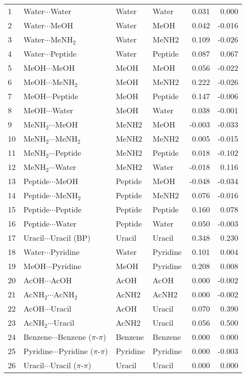 \begin{longtable}{llllrr}
1 & Water$\cdots$Water & Water & Water & 0.031 & 0.000 \\
2 & Water$\cdots$MeOH & Water & MeOH & 0.042 & -0.016 \\
3 & Water$\cdots$MeNH$_2$ & Water & MeNH2 & 0.109 & -0.026 \\
4 & Water$\cdots$Peptide & Water & Peptide & 0.087 & 0.067 \\
5 & MeOH$\cdots$MeOH & MeOH & MeOH & 0.056 & -0.022 \\
6 & MeOH$\cdots$MeNH$_2$ & MeOH & MeNH2 & 0.222 & -0.026 \\
7 & MeOH$\cdots$Peptide & MeOH & Peptide & 0.147 & -0.006 \\
8 & MeOH$\cdots$Water & MeOH & Water & 0.038 & -0.001 \\
9 & MeNH$_2$$\cdots$MeOH & MeNH2 & MeOH & -0.003 & -0.033 \\
10 & MeNH$_2$$\cdots$MeNH$_2$ & MeNH2 & MeNH2 & 0.005 & -0.015 \\
11 & MeNH$_2$$\cdots$Peptide & MeNH2 & Peptide & 0.018 & -0.102 \\
12 & MeNH$_2$$\cdots$Water & MeNH2 & Water & -0.018 & 0.116 \\
13 & Peptide$\cdots$MeOH & Peptide & MeOH & -0.048 & -0.034 \\
14 & Peptide$\cdots$MeNH$_2$ & Peptide & MeNH2 & 0.076 & -0.016 \\
15 & Peptide$\cdots$Peptide & Peptide & Peptide & 0.160 & 0.078 \\
16 & Peptide$\cdots$Water & Peptide & Water & 0.050 & -0.003 \\
17 & Uracil$\cdots$Uracil (BP) & Uracil & Uracil & 0.348 & 0.230 \\
18 & Water$\cdots$Pyridine & Water & Pyridine & 0.101 & 0.004 \\
19 & MeOH$\cdots$Pyridine & MeOH & Pyridine & 0.208 & 0.008 \\
20 & AcOH$\cdots$AcOH & AcOH & AcOH & 0.000 & -0.002 \\
21 & AcNH$_2$$\cdots$AcNH$_2$ & AcNH2 & AcNH2 & 0.000 & -0.002 \\
22 & AcOH$\cdots$Uracil & AcOH & Uracil & 0.070 & 0.390 \\
23 & AcNH$_2$$\cdots$Uracil & AcNH2 & Uracil & 0.056 & 0.500 \\
24 & Benzene$\cdots$Benzene ($\pi$-$\pi$) & Benzene & Benzene & 0.000 & 0.000 \\
25 & Pyridine$\cdots$Pyridine ($\pi$-$\pi$) & Pyridine & Pyridine & 0.000 & -0.003 \\
26 & Uracil$\cdots$Uracil ($\pi$-$\pi$) & Uracil & Uracil & 0.000 & 0.000 \\

\end{longtable}
